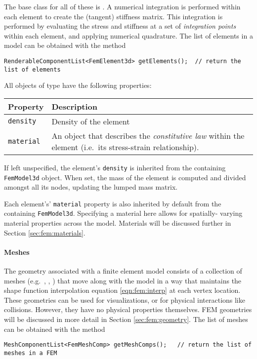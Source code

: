 The base class for all of these is .  A numerical integration is performed within each element
to create the (tangent) stiffness matrix.  This integration is performed
by evaluating the stress and stiffness at a set of \emph{integration points}
within each element, and applying numerical quadrature.  The list of elements
in a model can be obtained with the method
\begin{lstlisting}[]
RenderableComponentList<FemElement3d> getElements();  // return the list of elements
\end{lstlisting}

All objects of type  have the 
following properties:
\begin{center}
	\begin{tabular}{|ll|}
		\hline
		Property & Description\\
		\hline
		{\tt density} & Density of the element\\
		{\tt material} & An object that describes the \emph{constitutive law} 
		                 within the element (i.e.~its stress-strain 
		                 relationship).\\
		\hline
	\end{tabular}
\end{center}

If left unspecified, the element's {\tt density} is inherited from the 
containing {\tt FemModel3d} object.  When set, the mass of the element is
computed and divided amongst all its nodes, updating the lumped mass
matrix.

Each element's' {\tt material} property is also inherited by default from the 
containing {\tt FemModel3d}. Specifying a material here allows for spatially-%
varying material properties across the model.  Materials will be discussed
further in Section \ref{sec:fem:materials}.

\paragraph{Meshes}
\ifLaTeXML{\newline}

The geometry associated with a finite element model consists of a collection
of meshes (e.g.~, ,
) that move along with the
model in a way that maintains the shape function interpolation equation 
\eqref{eqn:fem:interp}
at each vertex location.  These geometries can be used for visualizations, or 
for physical interactions like collisions.  However, they have no physical 
properties themselves. FEM geometries will be discussed in more detail in 
Section \ref{sec:fem:geometry}.  The list of meshes can be obtained with the 
method
\begin{lstlisting}[]
MeshComponentList<FemMeshComp> getMeshComps();   // return the list of meshes in a FEM
\end{lstlisting}

